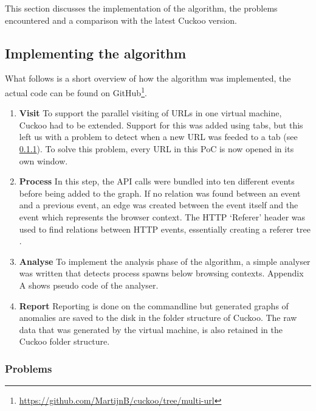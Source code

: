 This section discusses the implementation of the algorithm, the problems encountered and a comparison with the latest Cuckoo version.

\subsection{Implementing the algorithm}

What follows is a short overview of how the algorithm was implemented, the actual code can be found on GitHub\footnote{\url{https://github.com/MartijnB/cuckoo/tree/multi-url}}.

\begin{enumerate}
\item \textbf{Visit} To support the parallel visiting of URLs in one virtual machine, Cuckoo had to be extended. Support for this was added using tabs, but this left us with a problem to detect when a new URL was feeded to a tab (see \ref{99problems}). To solve this problem, every URL in this PoC is now opened in its own window.

\item \textbf{Process} In this step, the API calls were bundled into ten different events before being added to the graph. If no relation was found between an event and a previous event, an edge was created between the event itself and the event which represents the browser context. The HTTP `Referer' header was used to find relations between HTTP events, essentially creating a referer tree \cite{qui}. %

\item \textbf{Analyse} To implement the analysis phase of the algorithm, a simple analyser was written that detects process spawns below browsing contexts. Appendix A shows pseudo code of the analyser.

\item \textbf{Report} Reporting is done on the commandline but generated graphs of anomalies are saved to the disk in the folder structure of Cuckoo. The raw data that was generated by the virtual machine, is also retained in the Cuckoo folder structure.
\end{enumerate}

\subsubsection{Problems}
\label{99problems}

